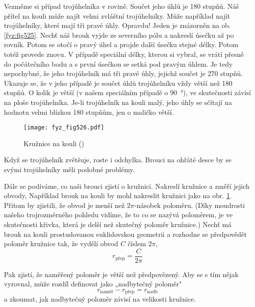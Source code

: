 {    Vezměme si případ trojúhelníka v rovině. Součet jeho úhlů je \num{180} stupňů. Náš přítel na 
    kouli může najít velmi zvláštní trojúhelníky. Může například najít trojúhelníky, které mají tři 
    pravé úhly. Opravdu! Jeden je znázorněn na ob. \ref{fyz:fig525}. Nechť náš brouk vyjde ze 
    severního pólu a nakreslí úsečku až po rovník. Potom se otočí o pravý úhel a projde další 
    úsečku stejné délky. Potom totéž provede znovu. V případě speciální délky, kterou si vybral, se 
    vrátí přesně do počátečního bodu a s první úsečkou se setká pod pravým úhlem. Je tedy 
    nepochybné, že jeho trojúhelník má tři pravé úhly, jejichž součet je \num{270} stupňů. Ukazuje 
    se, že v jeho případě je součet úhlů trojúhelníku vždy větší než \num{180} stupňů. O kolik je 
    větší (v našem speciálním případě o \SI{90}{\degree}), ve skutečnosti závisí na ploše 
    trojúhelníka. Je-li trojúhelník na kouli malý, jeho úhly se sčítají na hodnotu velmi blízkou 
    \num{180} stupňům, jen o maličko větší.
    
    \begin{figure}[ht!] %
      \centering
      \texttt{[image: fyz\_fig526.pdf]}
      \caption{Kružnice na kouli
               (\cite[s.~779]{Feynman02})}
      \label{fyz:fig526}
    \end{figure}
     
    Když se trojúhelník zvětšuje, roste i odchylka. Brouci na ohřáté desce by se svými trojúhelníky 
    měli podobné problémy.
    
    Dále se podíváme, co naši brouci zjistí o kružnici. Nakreslí kružnice a změří jejich obvody, 
    Například brouk na kouli by mohl nakreslit kružnici jako na obr. \ref{fyz:fig526}. Přitom by 
    zjistili, že obvod je menší než \(2\pi\)-násobek poloměru. (Díky moudrosti našeho 
    trojrozměrného pohledu vidíme, že to co se nazývá poloměrem, je ve skutečnosti křivka, která je 
    delší než skutečný poloměr kružnice.) Nechť má brouk na kouli prostudovanou euklidovskou 
    geometrii a rozhodne se předpovědět poloměr kružnice tak, že vydělí obvod \(C\) číslem \(2\pi\),
    \begin{equation}\label{fyz:eq528}
      r_{\text{přep}} = \dfrac{C}{2\pi}
    \end{equation}
    
    Pak zjistí, že naměřený poloměr je větší než předpovězený. Aby se s tím nějak vyrovnal, může 
    rozdíl definovat jako „nadbytečný poloměr"
    \begin{equation}\label{fyz:eq529}
      r_{\text{naměř}} - r_{\text{přep}} = r_{\text{nadb}}
    \end{equation}
    a zkoumat, jak nadbytečný poloměr závisí na velikosti kružnice. 
    
}
